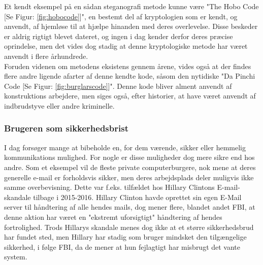 \noindent
Et kendt eksempel på en sådan steganografi metode kunne være "The Hobo Code [Se Figur: \ref{fig:hobocode}]", en bestemt del af kryptologien som er kendt, og anvendt, af hjemløse til at hjælpe hinanden med deres overlevelse\cite{TheHoboCode}. Disse beskeder er aldrig rigtigt blevet dateret, og ingen i dag kender derfor deres præcise oprindelse, men det vides dog stadig at denne kryptologiske metode har været anvendt i flere århundrede.\\ 
Foruden videnen om metodens eksistens gennem årene, vides også at der findes flere andre ligende afarter af denne kendte kode, såsom den nytidiske "Da Pinchi Code [Se Figur: \ref{fig:burglarscode}]". Denne kode bliver alment anvendt af konstruktions arbejdere, men siges også, efter historier, at have været anvendt af indbrudstyve eller andre kriminelle.\cite{DaPinchiCode}

\subsubsection{Brugeren som sikkerhedsbrist}
I dag forsøger mange at bibeholde en, for dem værende, sikker eller hemmelig kommunikations mulighed. For nogle er disse muligheder dog mere sikre end hos andre. Som et eksempel vil de fleste private computerburgere, nok mene at deres generelle e-mail er forholdsvis sikker, men deres arbejdsplads deler muligvis ikke samme overbevisning. Dette var f.eks. tilfældet hos Hillary Clintons E-mail-skandale tilbage i 2015-2016. \cite{Hillary_Email_History} Hillary Clinton havde oprettet sin egen E-Mail server til håndtering af alle hendes mails, dog mener flere, blandet andet FBI, at denne aktion har været en "ekstremt uforsigtigt" håndtering af hendes fortrolighed. Trods Hillarys skandale menes dog ikke at et større sikkerhedsbrud har fundet sted, men Hillary har stadig som bruger mindsket den tilgængelige sikkerhed, i følge FBI, da de mener at hun fejlagtigt har misbrugt det vante system. \cite{Hillary_Email_skandale}


